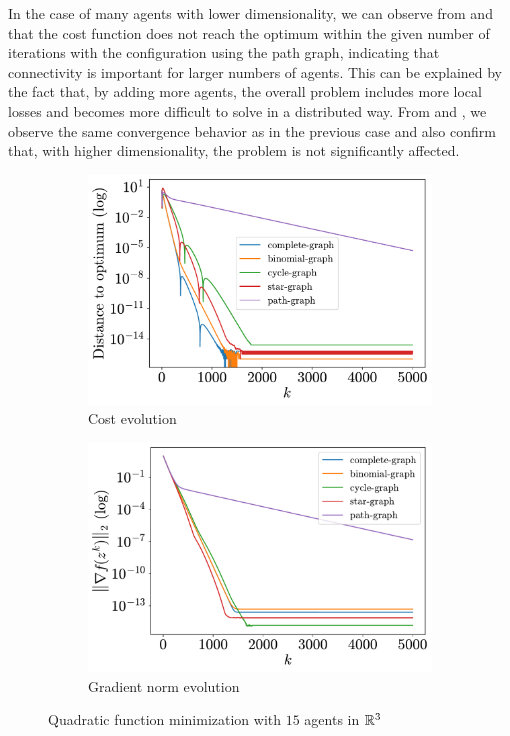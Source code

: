 \documentclass[a4paper,11pt,oneside]{book}
\begin{document}
In the case of many agents with lower dimensionality, we can observe from  and  that the cost function does not reach the optimum within the given number of iterations with the configuration using the path graph, indicating that connectivity is important for larger numbers of agents. This can be explained by the fact that, by adding more agents, the overall problem includes more local losses and becomes more difficult to solve in a distributed way. From  and , we observe the same convergence behavior as in the previous case and also confirm that, with higher dimensionality, the problem is not significantly affected.


\begin{figure}[H]
      \centering
      \begin{subfigure}[t]{0.46\linewidth}
            \centering
            \includegraphics[width=\linewidth]{./figs/quadratic/15_3/distance.pdf} 
            \caption{Cost evolution}
      \end{subfigure}
      \hfill
      \begin{subfigure}[t]{0.46\linewidth}
            \centering
            \includegraphics[width=\linewidth]{./figs/quadratic/15_3/gradient.pdf} 
            \caption{Gradient norm evolution}
      \end{subfigure}
      \caption{Quadratic function minimization with $15$ agents in ${\mathbb{R}}^{3}$}
      \label{fig:quadratic_15_3}
\end{figure}
\end{document}
